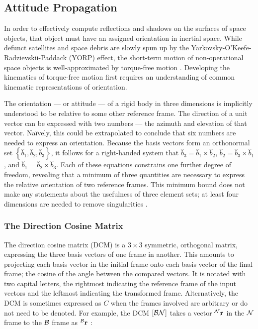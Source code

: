 \subsection{Attitude Propagation}

In order to effectively compute reflections and shadows on the surfaces of space objects, that object must have an assigned orientation in inertial space. While defunct satellites and space debris are slowly spun up by the Yarkovsky-O'Keefe-Radzievskii-Paddack (YORP) effect, the short-term motion of non-operational space objects is well-approximated by torque-free motion \cite{benson2018cyclic}. Developing the kinematics of torque-free motion first requires an understanding of common kinematic representations of orientation.

The orientation --- or attitude --- of a rigid body in three dimensions is implicitly understood to be relative to some other reference frame. The direction of a unit vector can be expressed with two numbers ---  the azimuth and elevation of that vector. Naïvely, this could be extrapolated to conclude that six numbers are needed to express an orientation. Because the basis vectors form an orthonormal set $\left\{ \hat{b}_1, \hat{b}_2, \hat{b}_3\right\}$, it follows for a right-handed system that $\hat{b}_3 = \hat{b}_1 \times \hat{b}_2$, $\hat{b}_2 = \hat{b}_3 \times \hat{b}_1$, and $\hat{b}_1 = \hat{b}_2 \times \hat{b}_3$. Each of these equations constrains one further degree of freedom, revealing that a minimum of three quantities are necessary to express the relative orientation of two reference frames. This minimum bound does not make any statements about the usefulness of three element sets; at least four dimensions are needed to remove singularities \cite{crassidis1ed}.

\subsubsection{The Direction Cosine Matrix}

The direction cosine matrix (DCM) is a $3\times3$ symmetric, orthogonal matrix, expressing the three basis vectors of one frame in another. This amounts to projecting each basis vector in the initial frame onto each basis vector of the final frame; the cosine of the angle between the compared vectors. It is notated with two capital letters, the rightmost indicating the reference frame of the input vectors and the leftmost indicating the transformed frame. Alternatively, the DCM is sometimes expressed as $C$ when the frames involved are arbitrary or do not need to be denoted. For example, the DCM $\dcm{bn}$ takes a vector $\vrf{n}{r}$ in the $\rf{n}$ frame to the $\rf{b}$ frame as $\vrf{b}{r}$ \cite{shuster1993}:

